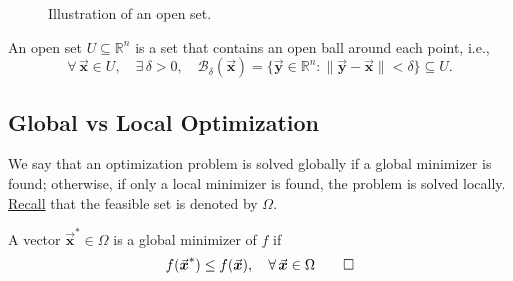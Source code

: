 \documentclass[9pt, headings=standardclasses, parskip=half]{scrartcl}
\renewcommand{\emph}[1]{\textcolor{mypurple}{#1}}
\newcommand{\vect}[1]{\vec{\boldsymbol{#1}}}
\begin{document}
\begin{figure}[h]
  \centering
  \caption*{Illustration of an open set.}
  \label{fig:open_set}
\end{figure}
\begin{definition}
An open set \(U\subseteq\mathbb{R}^{n}\) is a set that contains an open ball around each point, i.e.,
\[
\forall\, \vect{x}\in U, \quad \exists\, \delta>0, \quad \mathcal{B}_{\delta}(\vect{x})=\{ \vect{y}\in\mathbb{R}^{n} : \|\vect{y}-\vect{x}\|<\delta \} \subseteq U.
\]
\end{definition}



\subsection{Global vs Local Optimization}\label{subsec:global_local_optimization}
We say that an optimization problem is solved globally if a \emph{global minimizer} is found; otherwise, if only a \emph{local minimizer} is found, the problem is solved locally. \hyperref[eq:feasible_set]{Recall} that the feasible set is denoted by \(\Omega\).

\begin{definition}\label{def:global_minimizer}
A vector \(\vect{x}^{*}\in\Omega\) is a \emph{global minimizer} of \(f\) if
\[
f(\vect{x}^{*})\leq f(\vect{x}),\quad \forall\, \vect{x}\in\Omega \qedhere
\]
\end{definition}
\end{document}
